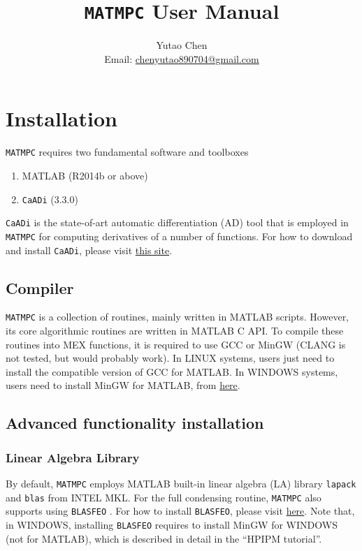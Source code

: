 \documentclass{article}
\newcommand{\software}[1]{{\tt#1}}
\begin{document}
	\title{\software{MATMPC} User Manual}
	\author{Yutao Chen\\ Email: \href{mailto:chenyutao890704@gmail.com}{chenyutao890704@gmail.com}}
	
	\maketitle
	
	\tableofcontents
	
	\newpage
	
\section{Installation}
\software{MATMPC} requires two fundamental software and toolboxes
\begin{enumerate}
	\item MATLAB (R2014b or above) 
	\item \software{CaADi} (3.3.0)
\end{enumerate}
\software{CaADi} is the state-of-art automatic differentiation (AD) tool \cite{andersson2018casadi} that is employed in \software{MATMPC} for computing derivatives of a number of functions. For how to download and install \software{CaADi}, please visit \href{https://github.com/casadi/casadi/wiki/InstallationInstructions}{this site}.

\subsection{Compiler}
\software{MATMPC} is a collection of routines, mainly written in MATLAB scripts. However, its core algorithmic routines are written in MATLAB C API. To compile these routines into MEX functions, it is required to use GCC or MinGW (CLANG is not tested, but would probably work). In LINUX systems, users just need to install the compatible version of GCC for MATLAB. In WINDOWS systems, users need to install MinGW for MATLAB, from \href{https://www.mathworks.com/matlabcentral/fileexchange/52848-matlab-support-for-mingw-w64-c-c-compiler}{here}.

\subsection{Advanced functionality installation}

\subsubsection{Linear Algebra Library}
By default, \software{MATMPC} employs MATLAB built-in linear algebra (LA) library \software{lapack} and \software{blas} from INTEL MKL. For the full condensing routine, \software{MATMPC} also supports using \software{BLASFEO} \cite{frison2018blasfeo}. For how to install \software{BLASFEO}, please visit \href{https://github.com/giaf/blasfeo}{here}. Note that, in WINDOWS, installing \software{BLASFEO} requires to install MinGW for WINDOWS (not for MATLAB), which is described in detail in the ``HPIPM tutorial''.
\end{document}
